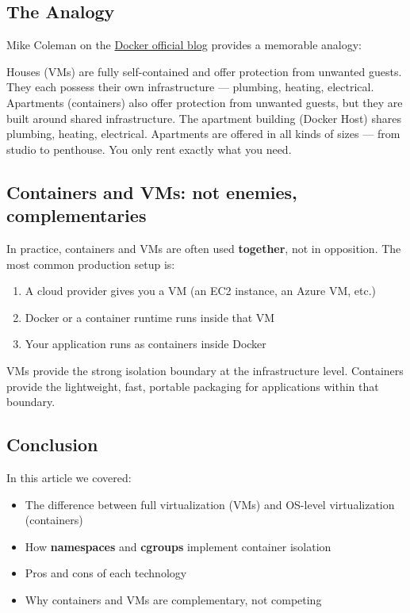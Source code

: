 \documentclass[11pt,american,a4paper,openany]{book}
\renewenvironment{quote}{\begin{quoteblock}}{\end{quoteblock}}
\providecommand{\tightlist}{%
  \setlength{\itemsep}{2pt}\setlength{\parskip}{0pt}}
\begin{document}
\subsection{The Analogy}\label{the-analogy}

Mike Coleman on the
\href{https://blog.docker.com/2016/03/containers-are-not-vms/}{Docker
official blog} provides a memorable analogy:

\begin{quote}
Houses (VMs) are fully self-contained and offer protection from unwanted
guests. They each possess their own infrastructure --- plumbing,
heating, electrical. Apartments (containers) also offer protection from
unwanted guests, but they are built around shared infrastructure. The
apartment building (Docker Host) shares plumbing, heating, electrical.
Apartments are offered in all kinds of sizes --- from studio to
penthouse. You only rent exactly what you need.
\end{quote}

\subsection{Containers and VMs: not enemies,
complementaries}\label{containers-and-vms-not-enemies-complementaries}

In practice, containers and VMs are often used \textbf{together}, not in
opposition. The most common production setup is:

\begin{enumerate}
\def\labelenumi{\arabic{enumi}.}
\tightlist
\item
  A cloud provider gives you a VM (an EC2 instance, an Azure VM, etc.)
\item
  Docker or a container runtime runs inside that VM
\item
  Your application runs as containers inside Docker
\end{enumerate}

VMs provide the strong isolation boundary at the infrastructure level.
Containers provide the lightweight, fast, portable packaging for
applications within that boundary.

\subsection{Conclusion}\label{conclusion-1}

In this article we covered:

\begin{itemize}
\tightlist
\item
  The difference between full virtualization (VMs) and OS-level
  virtualization (containers)
\item
  How \textbf{namespaces} and \textbf{cgroups} implement container
  isolation
\item
  Pros and cons of each technology
\item
  Why containers and VMs are complementary, not competing
\end{itemize}
\end{document}
